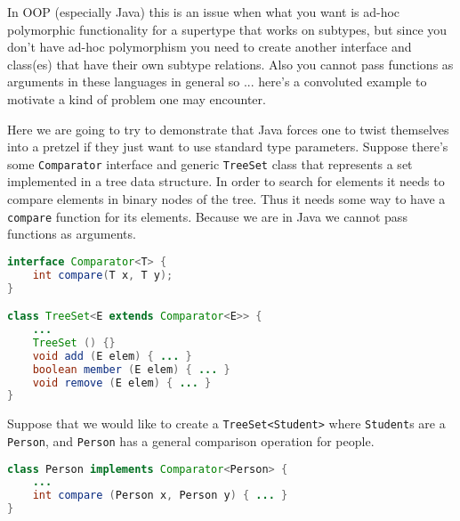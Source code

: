 \documentclass{article}
\begin{document}
In OOP (especially Java) this is an issue when what you want is ad-hoc polymorphic functionality for a supertype that works on subtypes, but since you don't have ad-hoc polymorphism you need to create another interface and class(es) that have their own subtype relations. Also you cannot pass functions as arguments in these languages in general so ... here's a convoluted example to motivate a kind of problem one may encounter.

\begin{example}
Here we are going to try to demonstrate that Java forces one to twist themselves into a pretzel if they just want to use standard type parameters.
Suppose there's some \texttt{Comparator} interface and generic \texttt{TreeSet} class that represents a set implemented in a tree data structure.
In order to search for elements it needs to compare elements in binary nodes of the tree.
Thus it needs some way to have a \texttt{compare} function for its elements.
Because we are in Java we cannot pass functions as arguments.
\begin{lstlisting}[escapechar=|, language=Java]
interface Comparator<T> {
    int compare(T x, T y);
}

class TreeSet<E extends Comparator<E>> {
    ...
    TreeSet () {}
    void add (E elem) { ... }
    boolean member (E elem) { ... }
    void remove (E elem) { ... }
}
\end{lstlisting}
Suppose that we would like to create a \texttt{TreeSet<Student>} where \texttt{Student}s are a \texttt{Person}, and \texttt{Person} has a general comparison operation for people.
\begin{lstlisting}[escapechar=|, language=Java]
class Person implements Comparator<Person> {
    ...
    int compare (Person x, Person y) { ... }
}


\end{lstlisting}
\end{example}
\end{document}
